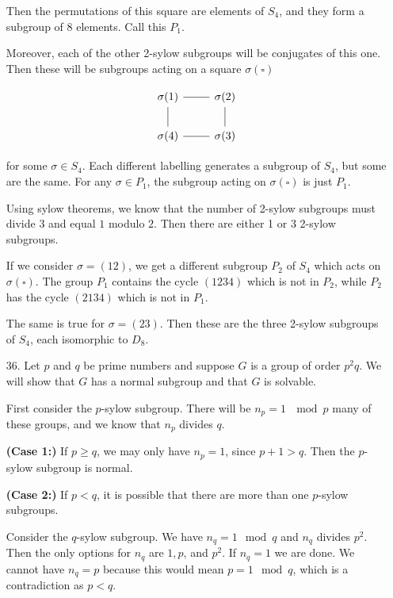 \documentclass[11pt, reqno]{article}
\theoremstyle{plain}
\theoremstyle{definition}
\theoremstyle{remark}
\begin{document}
\begin{enumerate}
    Then the permutations of this square are elements of $S_4$, and they form a subgroup of $8$ elements. Call this $P_1$.

    Moreover, each of the other 2-sylow subgroups will be conjugates of this one. Then these will be subgroups acting 
    on a square $\sigma(\square)$

    \begin{equation}    
        \begin{tikzcd}
            \sigma(1) \arrow[dash]{r} \arrow[dash]{d} & \sigma(2) \arrow[dash]{d}\\
            \sigma(4) \arrow[dash]{r} & \sigma(3)
        \end{tikzcd}
    \end{equation}

    for some $\sigma \in S_4$. Each different labelling generates a subgroup of $S_4$, but some are the same. For any
    $\sigma \in P_1$, the subgroup acting on $\sigma(\square)$ is just $P_1$. 

    Using sylow theorems, we know that the number of 2-sylow subgroups must divide $3$ and equal $1$ modulo $2$. Then there 
    are either 1 or 3 2-sylow subgroups. 

    If we consider $\sigma = (12)$, we get a different subgroup $P_2$ of $S_4$ which acts on 
    $\sigma(\square)$. The group $P_1$ contains the cycle $(1234)$ which is not in $P_2$, while $P_2$ has the cycle 
    $(2134)$ which is not in $P_1$. 

    The same is true for $\sigma = (23)$. Then these are the three 2-sylow subgroups of $S_4$, each isomorphic to $D_8$.

    \item[36.] Let $p$ and $q$ be prime numbers and suppose $G$ is a group of order $p^2q$. We will show that $G$ has a normal
    subgroup and that $G$ is solvable.
    
    First consider the $p$-sylow subgroup. There will be $n_p = 1\ \mod p$ many of these groups, and we know that 
    $n_p$ divides $q$. 

    \textbf{(Case 1:)} If $p \geq q$, we may only have $n_p = 1$, since $p + 1 > q$. Then the $p$-sylow subgroup is normal. 

    \textbf{(Case 2:)} If $p < q$, it is possible that there are more than one $p$-sylow subgroups.

    Consider the $q$-sylow subgroup. We have $n_q = 1 \mod q$ and $n_q$ divides $p^2$. Then the only options for $n_q$
    are $1, p$, and $p^2$. If $n_q = 1$ we are done. We cannot have $n_q = p$ because this would mean $p = 1 \mod q$,
    which is a contradiction as $p < q$. 


\end{enumerate}
\end{document}
